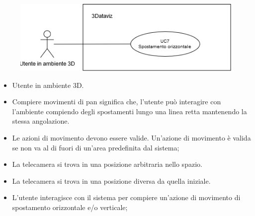 \begin{figure}[h!]
    \centering
    \includegraphics[scale=0.65]{template/images/UC7.png}
    \caption{}
\end{figure}
\UCdsc
    { %
        \begin{itemize}
            \item Utente in ambiente 3D.
        \end{itemize}
    }
    { %
        \begin{itemize}
            \item Compiere movimenti di pan significa che, l'utente può interagire con l'ambiente compiendo degli spostamenti lungo una linea retta mantenendo la stessa angolazione.
        \end{itemize}
    }
    { %
        \begin{itemize}
            \item Le azioni di movimento devono essere valide. Un'azione di movimento è valida se non va al di fuori di un'area predefinita dal sistema;
            \item La telecamera si trova in una posizione arbitraria nello spazio.
        \end{itemize}
    }
    { %
        \begin{itemize}
            \item La telecamera si trova in una posizione diversa da quella iniziale.
        \end{itemize}
    }
    { %
        \begin{itemize}
            \item L'utente interagisce con il sistema per compiere un'azione di movimento di spostamento orizzontale e/o verticale;
        \end{itemize}
    }

